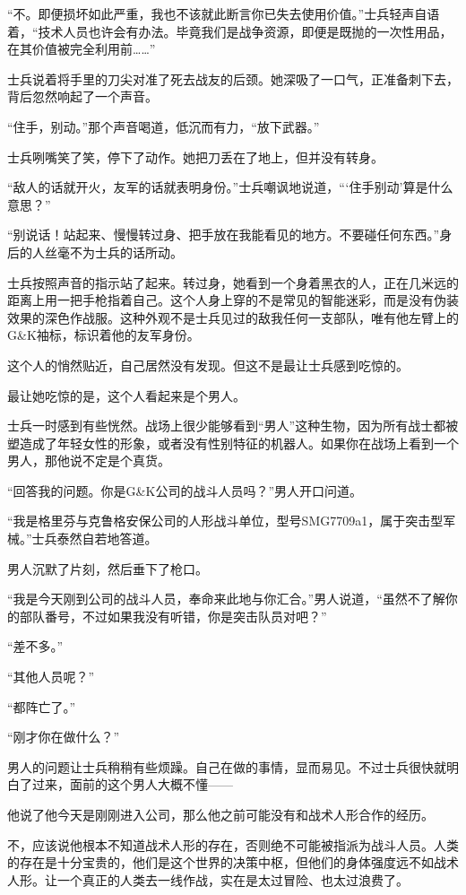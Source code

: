 “不。即便损坏如此严重，我也不该就此断言你已失去使用价值。”士兵轻声自语着，“技术人员也许会有办法。毕竟我们是战争资源，即便是既抛的一次性用品，在其价值被完全利用前……”

士兵说着将手里的刀尖对准了死去战友的后颈。她深吸了一口气，正准备刺下去，背后忽然响起了一个声音。

“住手，别动。”那个声音喝道，低沉而有力，“放下武器。”

士兵咧嘴笑了笑，停下了动作。她把刀丢在了地上，但并没有转身。

“敌人的话就开火，友军的话就表明身份。”士兵嘲讽地说道，“‘住手别动’算是什么意思？”

“别说话！站起来、慢慢转过身、把手放在我能看见的地方。不要碰任何东西。”身后的人丝毫不为士兵的话所动。

士兵按照声音的指示站了起来。转过身，她看到一个身着黑衣的人，正在几米远的距离上用一把手枪指着自己。这个人身上穿的不是常见的智能迷彩，而是没有伪装效果的深色作战服。这种外观不是士兵见过的敌我任何一支部队，唯有他左臂上的G\&K袖标，标识着他的友军身份。

这个人的悄然贴近，自己居然没有发现。但这不是最让士兵感到吃惊的。

最让她吃惊的是，这个人看起来是个男人。

士兵一时感到有些恍然。战场上很少能够看到“男人”这种生物，因为所有战士都被塑造成了年轻女性的形象，或者没有性别特征的机器人。如果你在战场上看到一个男人，那他说不定是个真货。

“回答我的问题。你是G\&K公司的战斗人员吗？”男人开口问道。

“我是格里芬与克鲁格安保公司的人形战斗单位，型号SMG7709a1，属于突击型军械。”士兵泰然自若地答道。

男人沉默了片刻，然后垂下了枪口。

“我是今天刚到公司的战斗人员，奉命来此地与你汇合。”男人说道，“虽然不了解你的部队番号，不过如果我没有听错，你是突击队员对吧？”

“差不多。”

“其他人员呢？”

“都阵亡了。”

“刚才你在做什么？”

男人的问题让士兵稍稍有些烦躁。自己在做的事情，显而易见。不过士兵很快就明白了过来，面前的这个男人大概不懂——

他说了他今天是刚刚进入公司，那么他之前可能没有和战术人形合作的经历。

不，应该说他根本不知道战术人形的存在，否则绝不可能被指派为战斗人员。人类的存在是十分宝贵的，他们是这个世界的决策中枢，但他们的身体强度远不如战术人形。让一个真正的人类去一线作战，实在是太过冒险、也太过浪费了。

